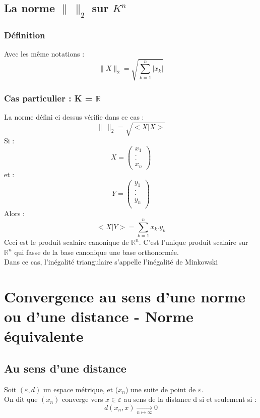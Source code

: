 \subsection{La norme $\parallel~\parallel_{2}$ sur $K^n$}
\subsubsection{Définition}
Avec les même notations :
$$\parallel X \parallel_{2} = \sqrt{\sum_{k=1}^n |x_k|}$$
\subsubsection{Cas particulier : K = $\mathbb{R}$}
La norme défini ci dessus vérifie dans ce cas : 
$$\parallel~\parallel_{2} = \sqrt{<X|X>}$$
Si :
$$X =
\begin{pmatrix}
x_1 \\
. \\
. \\
x_n \end{pmatrix}$$
et :
$$Y = \begin{pmatrix}
y_1 \\
. \\
. \\
y_n \\ \end{pmatrix}$$
Alors : 
$$<X|Y> = \sum_{k=1}^n x_k.y_k$$
Ceci est le produit scalaire canonique de $\mathbb{R}^n$. C'est l'unique produit scalaire sur $\mathbb{R}^n$ qui fasse de la base canonique une base orthonormée.\\
Dans ce cas, l'inégalité triangulaire s'appelle l'inégalité de Minkowski
\section{Convergence au sens d'une norme ou d'une distance - Norme équivalente}
\subsection{Au sens d'une distance}
\begin{de}
Soit $(\varepsilon,d)$ un espace métrique, et ($x_n$) une suite de point de $\varepsilon$.\\
On dit que $(x_n)$ converge vers $x \in \varepsilon$ au sens de la distance d si et seulement si : 
$$d(x_n,x) \underset{n \mapsto \infty}\rightarrow 0$$
\end{de}
